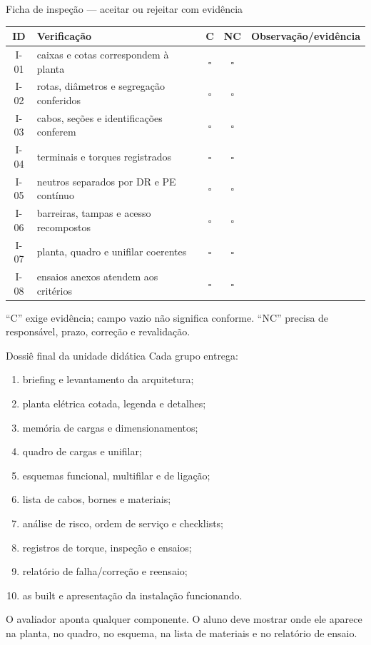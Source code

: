 \begin{frame}{Ficha de inspeção — aceitar ou rejeitar com evidência}
\scriptsize
\begin{tabularx}{\textwidth}{c X c c X}
\toprule
ID & Verificação & C & NC & Observação/evidência \\
\midrule
I-01 & caixas e cotas correspondem à planta & $\square$ & $\square$ & \\
I-02 & rotas, diâmetros e segregação conferidos & $\square$ & $\square$ & \\
I-03 & cabos, seções e identificações conferem & $\square$ & $\square$ & \\
I-04 & terminais e torques registrados & $\square$ & $\square$ & \\
I-05 & neutros separados por DR e PE contínuo & $\square$ & $\square$ & \\
I-06 & barreiras, tampas e acesso recompostos & $\square$ & $\square$ & \\
I-07 & planta, quadro e unifilar coerentes & $\square$ & $\square$ & \\
I-08 & ensaios anexos atendem aos critérios & $\square$ & $\square$ & \\
\bottomrule
\end{tabularx}
\begin{caixaObs}
“C” exige evidência; campo vazio não significa conforme. “NC” precisa de responsável, prazo, correção e revalidação.
\end{caixaObs}
\end{frame}

\begin{frame}{Dossiê final da unidade didática}
\scriptsize
Cada grupo entrega:
\begin{enumerate}
\item briefing e levantamento da arquitetura;
\item planta elétrica cotada, legenda e detalhes;
\item memória de cargas e dimensionamentos;
\item quadro de cargas e unifilar;
\item esquemas funcional, multifilar e de ligação;
\item lista de cabos, bornes e materiais;
\item análise de risco, ordem de serviço e checklists;
\item registros de torque, inspeção e ensaios;
\item relatório de falha/correção e reensaio;
\item as built e apresentação da instalação funcionando.
\end{enumerate}
\begin{caixaProjeto}[title=Defesa oral]
O avaliador aponta qualquer componente. O aluno deve mostrar onde ele aparece na planta, no quadro, no esquema, na lista de materiais e no relatório de ensaio.
\end{caixaProjeto}
\end{frame}



